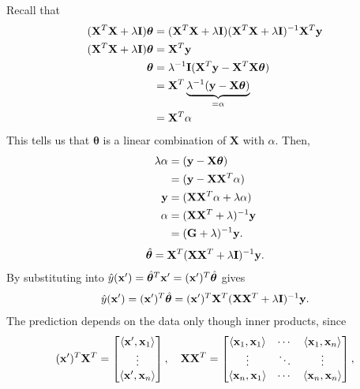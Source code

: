 Recall that 
\begin{align*}
	(\mathbf{X}^T\mathbf{X}+\lambda\mathbf{I})\boldsymbol{\theta}	&= (\mathbf{X}^T\mathbf{X}+\lambda\mathbf{I})(\mathbf{X}^T\mathbf{X}+\lambda\mathbf{I})^{-1}\mathbf{X}^T{\mathbf{y}}\\
	(\mathbf{X}^T\mathbf{X}+\lambda\mathbf{I})\boldsymbol{\theta} &= \mathbf{X}^T{\mathbf{y}}\\ 
	\boldsymbol{\theta} &= \lambda^{-1}\mathbf{I}(\mathbf{X}^T{\mathbf{y}}-\mathbf{X}^T\mathbf{X}\boldsymbol{\theta})\\
						&= \mathbf{X}^T\underbrace{\lambda^{-1}({\mathbf{y}}-\mathbf{X}\boldsymbol{\theta})}_{=\alpha}\\
	&= \mathbf{X}^T\alpha
\end{align*}
This tells us that $\boldsymbol{\theta}$ is a linear combination of $\boldsymbol{X}$ with $\alpha$. Then, 
\begin{align*}
	\lambda\alpha &= ({\mathbf{y}}-\mathbf{X}\boldsymbol{\theta})\\
	&= ({\mathbf{y}}-\mathbf{X}\mathbf{X}^T\alpha)\\
	{\mathbf{y}} &= (\mathbf{X}\mathbf{X}^T\alpha+\lambda\alpha)\\
	\alpha &= (\mathbf{X}\mathbf{X}^T+\lambda)^{-1}{\mathbf{y}}\\
	 &= (\mathbf{G}+\lambda)^{-1}{\mathbf{y}}.
\end{align*}
\begin{align*}
	\hat{\boldsymbol{\theta}} = \mathbf{X}^T(\mathbf{X}\mathbf{X}^T+\lambda\mathbf{I})^{-1}{\mathbf{y}}.
\end{align*}
By substituting into $\hat{y}({\mathbf{x}}') = \hat{\boldsymbol{\theta}}^T{\mathbf{x}}' = ({\mathbf{x}}')^T\hat{\boldsymbol{\theta}}$ gives
\begin{align*}
	\hat{y}({\mathbf{x}}') = ({\mathbf{x}}')^T\hat{\boldsymbol{\theta}} = ({\mathbf{x}}')^T\mathbf{X}^T(\mathbf{X}\mathbf{X}^T+\lambda\mathbf{I})^{-1}{\mathbf{y}}.
\end{align*}
The prediction depends on the data only though inner products, since
\begin{align*}
	({\mathbf{x}}')^T\mathbf{X}^T = \begin{bmatrix}
		\langle {\mathbf{x}}', {\mathbf{x}}_1 \rangle\\
		\vdots\\
		\langle {\mathbf{x}}', {\mathbf{x}}_n \rangle
	\end{bmatrix}, \quad
	\mathbf{X}\mathbf{X}^T = \begin{bmatrix}
		\langle {\mathbf{x}}_1, {\mathbf{x}}_1 \rangle & \cdots & \langle {\mathbf{x}}_1, {\mathbf{x}}_n \rangle\\
		\vdots & \ddots & \vdots\\
		\langle {\mathbf{x}}_n, {\mathbf{x}}_1 \rangle & \cdots & \langle {\mathbf{x}}_n, {\mathbf{x}}_n \rangle
	\end{bmatrix},
\end{align*}
